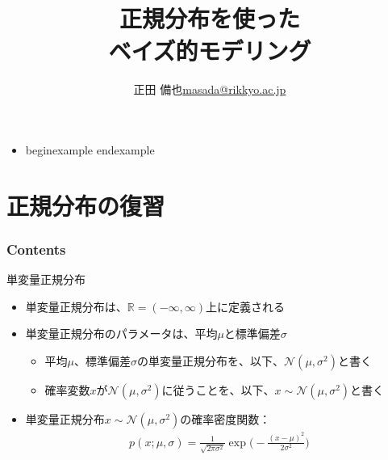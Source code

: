 \documentclass[aspectratio=169,unicode,dvipdfmx,14pt]{beamer}
\title{ \\正規分布を使った\\ベイズ的モデリング}
\author{\texorpdfstring{正田 備也\newline\href{mailto:masada@rikkyo.ac.jp}{masada@rikkyo.ac.jp}}{正田 備也}}
\date{}
\begin{document}
\begin{frame}
\titlepage
\end{frame}\begin{itemize}
\item begin{example}
end{example}
\end{itemize}


\section{正規分布の復習}

\begin{frame}\frametitle{Contents}
\Large \tableofcontents[currentsection]
\end{frame}

\begin{frame}{単変量正規分布}
\begin{itemize}
\item 単変量正規分布は、$\mathbb{R}=(-\infty,\infty)$上に定義される
\item 単変量正規分布のパラメータは、平均$\mu$と標準偏差$\sigma$
\begin{itemize}
\item 平均$\mu$、標準偏差$\sigma$の単変量正規分布を、以下、$\mathcal{N}(\mu,\sigma^2)$と書く
\item 確率変数$x$が$\mathcal{N}(\mu,\sigma^2)$に従うことを、以下、$x\sim\mathcal{N}(\mu,\sigma^2)$と書く
\end{itemize}
\item 単変量正規分布$x\sim\mathcal{N}(\mu,\sigma^2)$の確率密度関数：
\begin{align}
p(x;\mu,\sigma) = \frac{1}{\sqrt{2\pi\sigma^2}}\exp\Big( - \frac{(x - \mu)^2}{2\sigma^2} \Big)
\end{align}
\end{itemize}
\end{frame}
\end{document}
